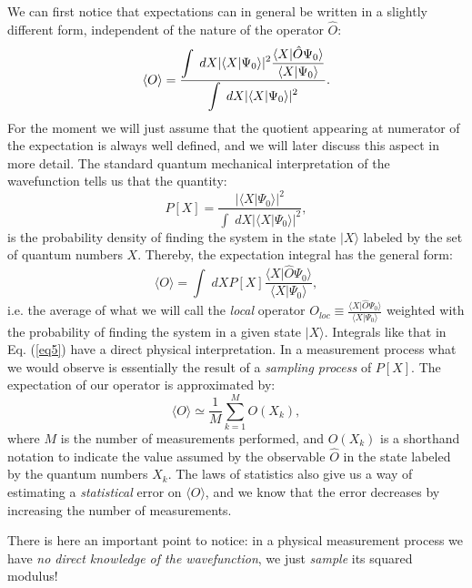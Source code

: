 We can first notice that expectations can in general be written in a slightly different form, independent of the nature of the operator $\hat{O}$:
\begin{equation}
\langle O\rangle =\displaystyle\frac{\displaystyle\int\; dX \vert \langle X\vert \Psi_0\rangle\vert^2\displaystyle\displaystyle\frac{\langle X \vert \hat{O}\Psi_0\rangle}{\langle X\vert \Psi_0\rangle}}{\displaystyle\int\; dX \vert\langle X \vert \Psi_0\rangle \vert^2}.
\end{equation}
For the moment we will just assume that the quotient appearing at numerator of the expectation is always well defined, and we will later discuss this aspect in more detail.
The standard quantum mechanical interpretation of the wavefunction tells us that the quantity:
\begin{equation}
P[X]=\frac{\vert \langle X\vert \Psi_0\rangle\vert^2}{\displaystyle\int\; dX \vert\langle X \vert \Psi_0\rangle \vert^2},
\end{equation}  
is the probability density of finding the system in the state $\vert X \rangle$ labeled by the set of quantum numbers $X$. Thereby, the expectation integral has the general form:
\begin{equation}
\langle O\rangle =\int\; dX P[X]\displaystyle\frac{\langle X \vert \hat{O}\Psi_0\rangle}{\langle X\vert \Psi_0\rangle},
\label{eq5}
\end{equation}
i.e. the average of what we will call the {\it local} operator $O_{loc}\equiv \frac{\langle X \vert \hat{O}\Psi_0\rangle}{\langle X\vert \Psi_0\rangle}$ weighted with the probability of finding the system in a given state $\vert X\rangle$. 
Integrals like that in Eq. (\ref{eq5}) have a direct physical interpretation. In a measurement process what we would observe is essentially the result of a {\it sampling process} of $P[X]$. The expectation of our operator is approximated by:
\begin{equation}
\langle O \rangle \simeq \frac{1}{M}\sum_{k=1}^M{O(X_k)},
\end{equation}
where $M$ is the number of measurements performed, and $O(X_k)$ is a shorthand notation to 
indicate the value assumed by the observable $\hat{O}$ in the state labeled by the quantum numbers $X_k$. The laws of statistics also give us a way of estimating a {\it statistical} error on $\langle O \rangle$, and we know that the error decreases by increasing 
the number of measurements. 

There is here an important point to notice: in a physical measurement process we have {\it no direct knowledge  of the wavefunction}, we just {\it sample} its squared modulus! 

